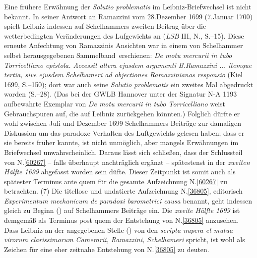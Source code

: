 Eine frühere Erwähnung der \textit{Solutio problematis}\cite{01450} im Leibniz-Briefwechsel ist nicht bekannt.
In seiner Antwort an Ramazzini vom 28.\;Dezember 1699 (7.\;Januar 1700) spielt Leibniz indessen auf Schelhammers zweiten Beitrag über die wetterbedingten Veränderungen des Lufgewichts an (\textit{LSB} III, N., S.--15).\cite{01449}
Diese erneute Anfechtung von Ramazzinis Ansichten war in einem von Schelhammer selbst herausgegebenen \glqq Sammelband\grqq\ erschienen: \textit{De motu mercurii in tubo Torricelliano epistola. Accessit altera ejusdem argumenti B.\;Ramazzini ... itemque tertia, sive ejusdem Schelhameri ad objectiones Ramazzinianas responsio} (Kiel 1699, S.--150);\cite{01452}
dort war auch seine \textit{Solutio problematis} ein zweites Mal abgedruckt worden (S.--28).\cite{01450}\cite{01452}
(Das bei der GWLB Hannover unter der Signatur N-A 1193 aufbewahrte Exemplar von \textit{De motu mercurii in tubo Torricelliano}\cite{01452} weist Gebrauchspuren auf, die auf Leibniz zurückgehen könnten.)
Folglich dürfte er wohl zwischen Juli und Dezember 1699 Schelhammers Beiträge zur damaligen Diskussion um das paradoxe Verhalten des Luftgewichts gelesen haben;
dass er sie bereits früher kannte, ist nicht unmöglich, aber mangels Erwähnungen im Briefwechsel unwahrscheinlich.
Daraus lässt sich schließen, dass der Schlussteil von N.\;\ref{60267} -- falls überhaupt nachträglich ergänzt -- spätestenst in der \textit{zweiten Hälfte 1699} abgefasst worden sein düfte.
Dieser Zeitpunkt ist somit auch als spätester Terminus ante quem für die gesamte Aufzeichnung N.\;\ref{60267} zu betrachten.%
\pend%
\pstart%
(7)
Die titellose und undatierte Aufzeichnung N.\;\ref{36805}, editorisch \textit{Experimentum mechanicum de paradoxi barometrici causa} benannt, geht indessen gleich zu Beginn () auf Schelhammers Beiträge ein.
Die \textit{zweite Hälfte 1699} ist demgemäß als Terminus post quem der Entstehung von N.\;\ref{36805} anzusehen.
Dass Leibniz an der angegebenen Stelle () von den \textit{scripta nupera et mutua virorum clarissimorum Camerarii, Ramazzini, Schelhameri} spricht, ist wohl als Zeichen für eine eher zeitnahe Entstehung von N.\;\ref{36805} zu deuten.
